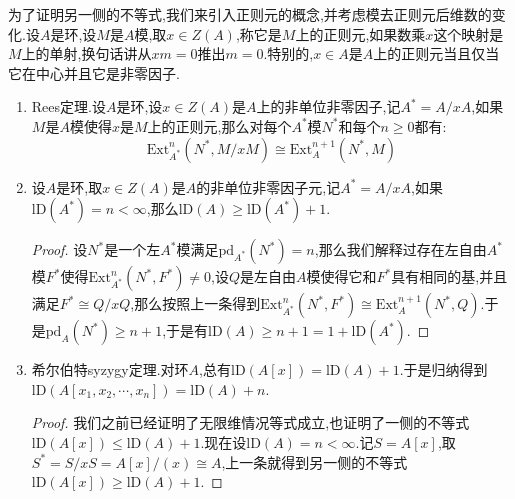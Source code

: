 为了证明另一侧的不等式,我们来引入正则元的概念,并考虑模去正则元后维数的变化.设$A$是环,设$M$是$A$模,取$x\in Z(A)$,称它是$M$上的正则元,如果数乘$x$这个映射是$M$上的单射,换句话讲从$xm=0$推出$m=0$.特别的,$x\in A$是$A$上的正则元当且仅当它在中心并且它是非零因子.
\begin{enumerate}
	\item Rees定理.设$A$是环,设$x\in Z(A)$是$A$上的非单位非零因子,记$A^*=A/xA$,如果$M$是$A$模使得$x$是$M$上的正则元,那么对每个$A^*$模$N^*$和每个$n\ge0$都有:
	$$\mathrm{Ext}_{A^*}^n(N^*,M/xM)\cong\mathrm{Ext}_A^{n+1}(N^*,M)$$
	\item 设$A$是环,取$x\in Z(A)$是$A$的非单位非零因子元,记$A^*=A/xA$,如果$\mathrm{lD}(A^*)=n<\infty$,那么$\mathrm{lD}(A)\ge\mathrm{lD}(A^*)+1$.
	\begin{proof}
		
		设$N^*$是一个左$A^*$模满足$\mathrm{pd}_{A^*}(N^*)=n$,那么我们解释过存在左自由$A^*$模$F^*$使得$\mathrm{Ext}_{A^*}^n(N^*,F^*)\not=0$,设$Q$是左自由$A$模使得它和$F^*$具有相同的基,并且满足$F^*\cong Q/xQ$,那么按照上一条得到$\mathrm{Ext}_{A^*}^n(N^*,F^*)\cong\mathrm{Ext}_A^{n+1}(N^*,Q)$.于是$\mathrm{pd}_A(N^*)\ge n+1$,于是有$\mathrm{lD}(A)\ge n+1=1+\mathrm{lD}(A^*)$.
	\end{proof}
    \item 希尔伯特syzygy定理.对环$A$,总有$\mathrm{lD}(A[x])=\mathrm{lD}(A)+1$.于是归纳得到$\mathrm{lD}(A[x_1,x_2,\cdots,x_n])=\mathrm{lD}(A)+n$.
    \begin{proof}
    	
    	我们之前已经证明了无限维情况等式成立,也证明了一侧的不等式$\mathrm{lD}(A[x])\le\mathrm{lD}(A)+1$.现在设$\mathrm{lD}(A)=n<\infty$.记$S=A[x]$,取$S^*=S/xS=A[x]/(x)\cong A$,上一条就得到另一侧的不等式$\mathrm{lD}(A[x])\ge\mathrm{lD}(A)+1$.
    \end{proof}
\end{enumerate}

